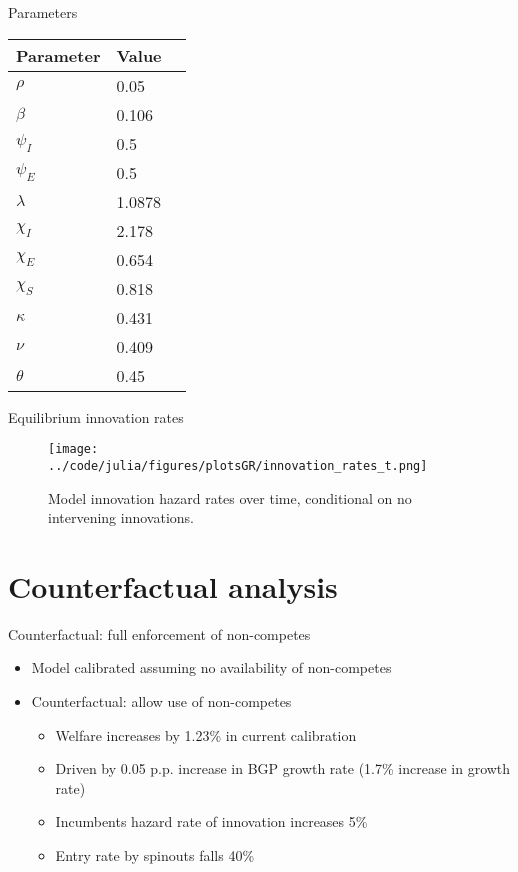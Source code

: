 \documentclass[english,usenames,dvipsnames]{beamer}
\begin{document}
\begin{frame}{Parameters}
\begin{center}
	\small
	\begin{tabular}{lll}
		\hline 
		\textbf{Parameter} & \textbf{Value}\tabularnewline
		\hline 
		$\rho$ & 0.05\tabularnewline
		$\beta$ & 0.106\tabularnewline
		$\psi_I$ & 0.5\tabularnewline
		$\psi_E$ & 0.5\tabularnewline
		$\lambda$ & 1.0878\tabularnewline
		$\chi_I$ & 2.178 \tabularnewline
		$\chi_E$ & 0.654 \tabularnewline
		$\chi_S$ & 0.818 \tabularnewline
		$\kappa$ & 0.431 \tabularnewline
		$\nu$ & 0.409 \tabularnewline
		$\theta$ & 0.45
	\end{tabular}
	\label{calibration_parameters}
\end{center}
\end{frame}


\begin{frame}{Equilibrium innovation rates}
\begin{figure}
	\texttt{[image: ../code/julia/figures/plotsGR/innovation\_rates\_t.png]}
	\caption{Model innovation hazard rates over time, conditional on no intervening innovations.}
\end{figure}
\end{frame}




\section{Counterfactual analysis}

\begin{frame}
\tableofcontents[currentsection]
\end{frame}



\begin{frame}{Counterfactual: full enforcement of non-competes}
\begin{itemize}
	\item Model calibrated assuming no availability of non-competes
	\item Counterfactual: allow use of non-competes
	\begin{itemize}
		\item Welfare increases by 1.23\% in current calibration
		\item Driven by 0.05 p.p. increase in BGP growth rate (1.7\% increase in growth rate)
		\item Incumbents hazard rate of innovation increases 5\%
		\item Entry rate by spinouts falls 40\%
	\end{itemize}
\end{itemize}
\end{frame}
\end{document}
